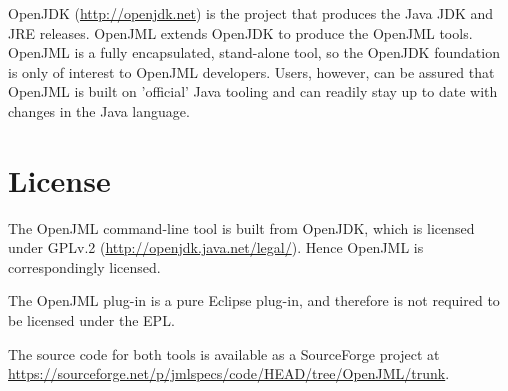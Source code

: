 OpenJDK (\url{http://openjdk.net}) is the project that produces the Java JDK and JRE releases.
OpenJML extends OpenJDK to produce the OpenJML tools. OpenJML is a 
fully encapsulated, stand-alone tool, so the OpenJDK foundation is only of interest to OpenJML developers.
Users, however, can be assured that OpenJML is built on 'official' Java tooling and can readily stay up 
to date with changes in the Java language.

\section{License}

The OpenJML command-line tool is built from OpenJDK, which is licensed under GPLv.2 (\url{http://openjdk.java.net/legal/}).
Hence OpenJML is correspondingly licensed.

The OpenJML plug-in is a pure Eclipse plug-in, and therefore is not required to be licensed under the EPL.


The source code for both tools is available as a SourceForge project at
\url{https://sourceforge.net/p/jmlspecs/code/HEAD/tree/OpenJML/trunk}.
